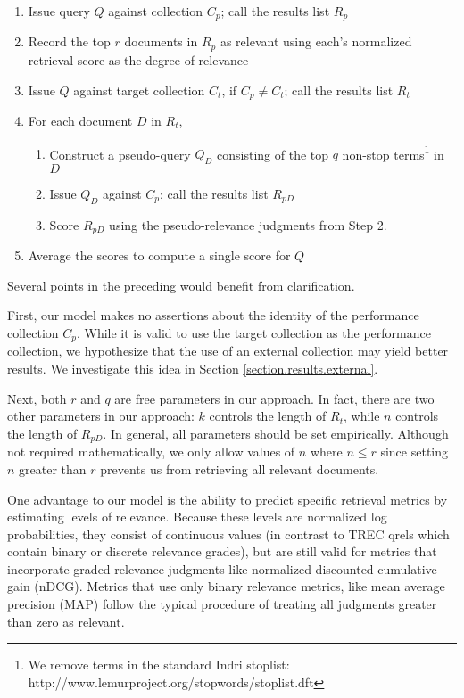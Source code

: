 \documentclass{sig-alternate}
\begin{document}
\begin{enumerate}
	\item Issue query $Q$ against collection $C_p$; call the results list $R_p$
	\item Record the top $r$ documents in $R_p$ as relevant using each's normalized retrieval score as the degree of relevance
	\item Issue $Q$ against target collection $C_t$, if $C_p \neq C_t$; call the results list $R_t$
	\item For each document $D$ in $R_t$,
	\begin{enumerate}
		\item Construct a pseudo-query $Q_D$ consisting of the top $q$ non-stop terms\footnote{We remove terms in the standard Indri stoplist: http://www.lemurproject.org/stopwords/stoplist.dft} in $D$
		\item Issue $Q_D$ against $C_p$; call the results list $R_{pD}$
		\item Score $R_{pD}$ using the pseudo-relevance judgments from Step 2.
	\end{enumerate}
	\item Average the scores to compute a single score for $Q$
\end{enumerate}

\noindent Several points in the preceding would benefit from clarification.

First, our model makes no assertions about the identity of the performance collection $C_p$. While it is valid to use the target collection as the performance collection, we hypothesize that the use of an external collection may yield better results. We investigate this idea in Section \ref{section.results.external}.

Next, both $r$ and $q$ are free parameters in our approach. In fact, there are two other parameters in our approach: $k$ controls the length of $R_t$, while $n$ controls the length of $R_{pD}$. In general, all parameters should be set empirically. Although not required mathematically, we only allow values of $n$ where $n \leq r$ since setting $n$ greater than $r$ prevents us from retrieving all relevant documents.

One advantage to our model is the ability to predict specific retrieval metrics by estimating levels of relevance. Because these levels are normalized log probabilities, they consist of continuous values (in contrast to TREC qrels which contain binary or discrete relevance grades), but are still valid for metrics that incorporate graded relevance judgments like normalized discounted cumulative gain (nDCG). Metrics that use only binary relevance metrics, like mean average precision (MAP) follow the typical procedure of treating all judgments greater than zero as relevant. 
\end{document}
